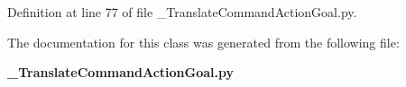 \subsubsection[{header}]{}\label{classoryx__drive__controller_1_1msg_1_1__TranslateCommandActionGoal_1_1TranslateCommandActionGoal_afb079352ff529ba23355e722825259a4}


\-Definition at line 77 of file \-\_\-\-Translate\-Command\-Action\-Goal.\-py.



\-The documentation for this class was generated from the following file\-:\begin{DoxyCompactItemize}
\item 
{\bf \-\_\-\-Translate\-Command\-Action\-Goal.\-py}\end{DoxyCompactItemize}
